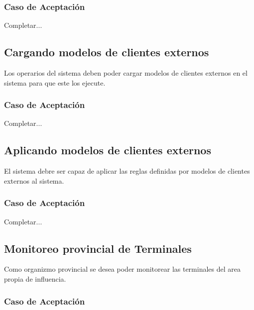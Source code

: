 \subsubsection*{Caso de Aceptación}
Completar...

\linea \subsection*{Cargando modelos de clientes externos}
Los operarios del sistema deben poder cargar modelos de clientes externos en el sistema para que este los ejecute.
\subsubsection*{Caso de Aceptación}
Completar...

\linea \subsection*{Aplicando modelos de clientes externos}
El sistema debre ser capaz de aplicar las reglas definidas por modelos de clientes externos al sistema.
\subsubsection*{Caso de Aceptación}
Completar...


\linea 
\subsection*{Monitoreo provincial de Terminales}
Como organizmo provincial se desea poder monitorear las terminales del area propia de influencia.
\subsubsection*{Caso de Aceptación}

